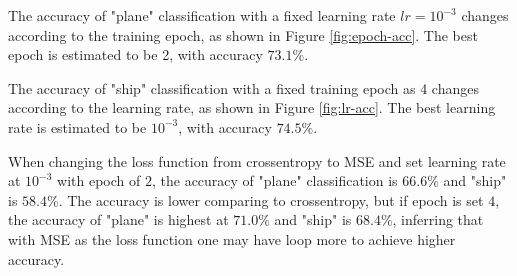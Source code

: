 \documentclass{article}
\begin{document}
The accuracy of "plane" classification with a fixed learning rate $lr=10^{-3}$ changes according to the training epoch, as shown in Figure \ref{fig:epoch-acc}. The best epoch is estimated to be 2, with accuracy $73.1\%$.

The accuracy of "ship" classification with a fixed training epoch as 4 changes according to the learning rate, as shown in Figure \ref{fig:lr-acc}. The best learning rate is estimated to be $10^{-3}$, with accuracy $74.5\%$.

When changing the loss function from crossentropy to MSE and set learning rate at $10^{-3}$ with epoch of $2$, the accuracy of "plane" classification is $66.6\%$ and "ship" is $58.4\%$. The accuracy is lower comparing to crossentropy, but if epoch is set $4$, the accuracy of "plane" is highest at $71.0\%$ and "ship" is $68.4\%$, inferring that with MSE as the loss function one may have loop more to achieve higher accuracy.



\end{document}

